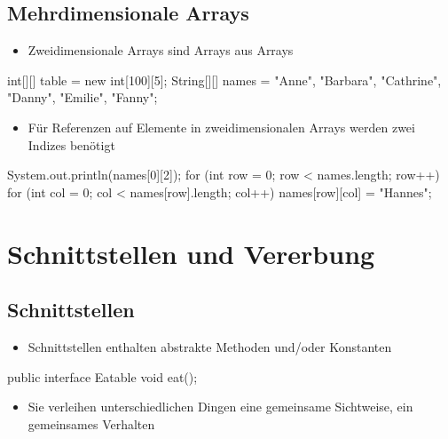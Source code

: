 \documentclass[a4paper,10pt, dvipsnames]{report}
\begin{document}
\subsection{Mehrdimensionale Arrays}

\begin{itemize}
	\item Zweidimensionale Arrays sind Arrays aus Arrays
\end{itemize}

\begin{javacodebox}
    int[][] table = new int[100][5];
    String[][] names = {{"Anne", "Barbara", "Cathrine"}, {"Danny", "Emilie", "Fanny"}};
\end{javacodebox}

\begin{itemize}
	\item Für Referenzen auf Elemente in zweidimensionalen Arrays werden zwei Indizes benötigt
\end{itemize}


\begin{javacodebox}
    System.out.println(names[0][2]);
    for (int row = 0; row < names.length; row++)
        for (int col = 0; col < names[row].length; col++)
            names[row][col] = "Hannes";
\end{javacodebox}


\section{Schnittstellen und Vererbung}

\subsection{Schnittstellen}

\begin{itemize}
	\item Schnittstellen enthalten abstrakte Methoden und/oder Konstanten
\end{itemize}

\begin{javacodebox}
    public interface Eatable {
        void eat();
    }
\end{javacodebox}


\begin{itemize}
	\item Sie verleihen unterschiedlichen Dingen eine gemeinsame Sichtweise, ein gemeinsames Verhalten
\end{itemize}
\end{document}
